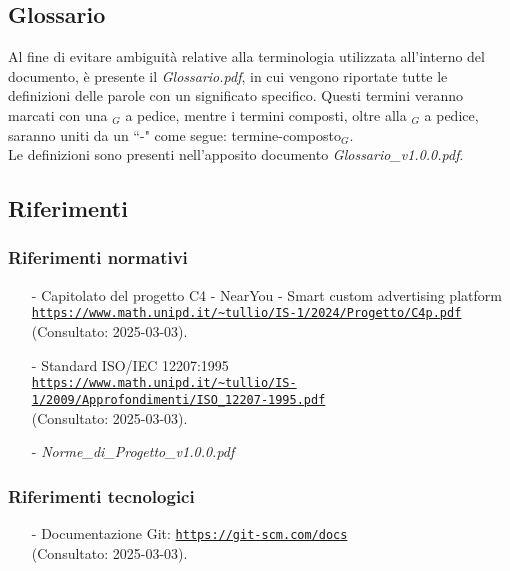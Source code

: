 \documentclass[10pt]{article}
\begin{document}
\begin{justify}
\subsection{Glossario}
Al fine di evitare ambiguità relative alla terminologia utilizzata all'interno del documento, è presente il \textit{Glossario.pdf}, in cui vengono riportate tutte le definizioni delle parole con un significato specifico. Questi termini veranno marcati con una $_G$ a pedice, mentre i termini composti, oltre alla $_G$ a pedice, saranno uniti da un ``-" come segue: termine-composto$_G$.\\
Le definizioni sono presenti nell'apposito documento \textit{Glossario\_v1.0.0.pdf}.

\subsection{Riferimenti}

\subsubsection{Riferimenti normativi}
\begin{itemize}
    \item[-] Capitolato del progetto C4 - NearYou - Smart custom advertising platform \\ 
    \textcolor{blue}{\texttt{\url{https://www.math.unipd.it/~tullio/IS-1/2024/Progetto/C4p.pdf}}} \\ 
    (Consultato: 2025-03-03).
    
    \item[-] Standard ISO/IEC 12207:1995 \\ 
    \textcolor{blue}{\texttt{\url{https://www.math.unipd.it/~tullio/IS-1/2009/Approfondimenti/ISO_12207-1995.pdf}}} \\
    (Consultato: 2025-03-03).
    
    \item[-] \textit{Norme\_di\_Progetto\_v1.0.0.pdf}
\end{itemize}

\subsubsection{Riferimenti tecnologici}
\begin{itemize}
    \item[-] Documentazione Git: \textcolor{blue}{\texttt{\url{https://git-scm.com/docs}}} \\
    (Consultato: 2025-03-03).
    

\end{itemize}
\end{justify}
\end{document}
